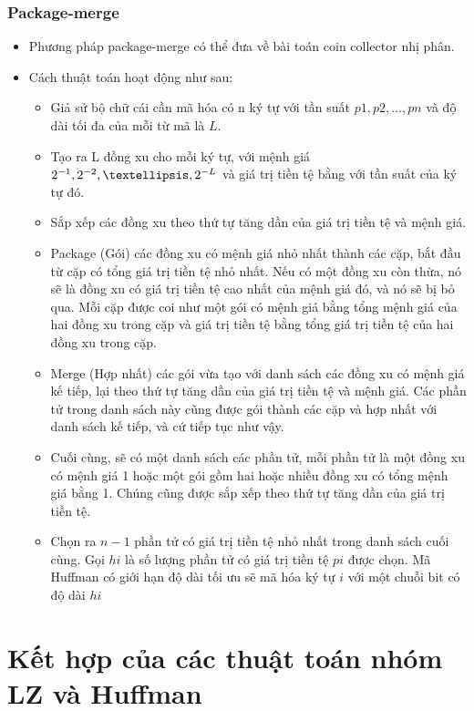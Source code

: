 \subsubsection{Package-merge}
\begin{itemize}
    \item Phương pháp package-merge có thể đưa về bài toán coin collector nhị phân.
    \item Cách thuật toán hoạt động như sau:
    \begin{itemize}
        \item Giả sử bộ chữ cái cần mã hóa có n ký tự với tần suất $p1, p2, …, pn$ và độ dài tối đa của mỗi từ mã là $L$.
        \item Tạo ra L đồng xu cho mỗi ký tự, với mệnh giá $2\sp{-1}, 2\sp{-2}, …, 2\sp{-L}$ và giá trị tiền tệ bằng với tần suất của ký tự đó.
        \item Sắp xếp các đồng xu theo thứ tự tăng dần của giá trị tiền tệ và mệnh giá.
        \item Package (Gói) các đồng xu có mệnh giá nhỏ nhất thành các cặp, bắt đầu từ cặp có tổng giá trị tiền tệ nhỏ nhất. Nếu có một đồng xu còn thừa, nó sẽ là đồng xu có giá trị tiền tệ cao nhất của mệnh giá đó, và nó sẽ bị bỏ qua. Mỗi cặp được coi như một gói có mệnh giá bằng tổng mệnh giá của hai đồng xu trong cặp và giá trị tiền tệ bằng tổng giá trị tiền tệ của hai đồng xu trong cặp.
        \item Merge (Hợp nhất) các gói vừa tạo với danh sách các đồng xu có mệnh giá kế tiếp, lại theo thứ tự tăng dần của giá trị tiền tệ và mệnh giá. Các phần tử trong danh sách này cũng được gói thành các cặp và hợp nhất với danh sách kế tiếp, và cứ tiếp tục như vậy.
        \item Cuối cùng, sẽ có một danh sách các phần tử, mỗi phần tử là một đồng xu có mệnh giá 1 hoặc một gói gồm hai hoặc nhiều đồng xu có tổng mệnh giá bằng 1. Chúng cũng được sắp xếp theo thứ tự tăng dần của giá trị tiền tệ.
        \item Chọn ra $n - 1$ phần tử có giá trị tiền tệ nhỏ nhất trong danh sách cuối cùng. Gọi $hi$ là số lượng phần tử có giá trị tiền tệ $pi$ được chọn. Mã Huffman có giới hạn độ dài tối ưu sẽ mã hóa ký tự $i$ với một chuỗi bit có độ dài $hi$
    \end{itemize}
\end{itemize}


\section{Kết hợp của các thuật toán nhóm LZ và Huffman}


